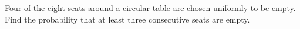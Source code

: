 Four of the eight seats around a circular table are chosen uniformly to be empty. Find the probability that at least three consecutive seats are empty.
